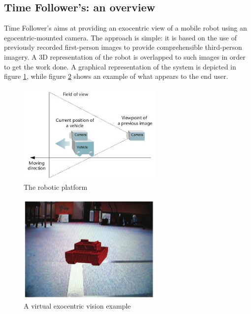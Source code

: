 \subsection{Time Follower's: an overview}
\label{exo:why_exocentric::time_follower}

Time Follower's aims at providing an exocentric view of a mobile 
robot using an egocentric-mounted camera. The approach is simple: it is 
based on the use of previously recorded first-person images to provide 
comprehensible third-person imagery. A 3D representation of the robot 
is overlapped to such images in order to get the work done. A graphical
representation of the system is depicted in figure \ref{fig:exocentric}, 
while figure \ref{fig:virtualexocentric} shows an example of what appears 
to the end user.
\begin{figure}[!h]
  \begin{center}
    \includegraphics[width=200pt]{img/exocentric_vision.jpg}
    \caption{The \morduc{} robotic platform}
    \label{fig:exocentric}
  \end{center}
\end{figure}

\begin{figure}[!h]
  \begin{center}
    \includegraphics[width=200pt]{img/virtual_exocentric.jpg}  %
    \caption{A virtual exocentric vision example}
    \label{fig:virtualexocentric}
  \end{center}
\end{figure}

